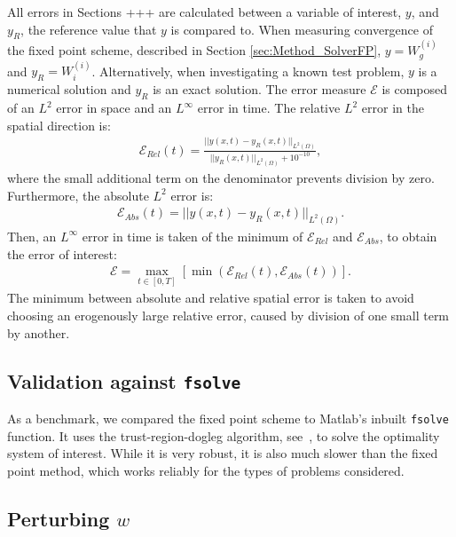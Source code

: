 \documentclass[11pt, a4paper]{article}
\theoremstyle{definition}
\begin{document}
All errors in Sections +++ are calculated between a variable of interest, $y$, and $y_R$, the reference value that $y$ is compared to. When measuring convergence of the fixed point scheme, described in Section \ref{sec:Method_SolverFP}, $y = W^{(i)}_g$ and $y_R = W^{(i)}_i$. Alternatively, when investigating a known test problem, $y$ is a numerical solution and $y_R$ is an exact solution. The error measure $\mathcal{E}$ is composed of an $L^2$ error in space and an $L^\infty$ error in time. The relative $L^2$ error in the spatial direction is:
\begin{align*}
\mathcal{E}_{Rel}(t) = \frac{|| y(x,t) - y_{R}(x,t)||_{L^2(\Omega)} }{||y_R(x,t) ||_{L^2(\Omega)}+ 10^{-10}},
\end{align*}
where the small additional term on the denominator prevents division by zero.
Furthermore, the absolute $L^2$ error is:
\begin{align*}
\mathcal{E}_{Abs}(t) = || y(x,t) - y_R(x,t)||_{L^2(\Omega)}.
\end{align*}
Then, an $L^\infty$ error in time is taken of the minimum of $\mathcal{E}_{Rel}$ and $\mathcal{E}_{Abs}$, to obtain the error of interest:
\begin{align*}
\mathcal{E} = \max_{t \in [0,T]}\left[\min\left(\mathcal{E}_{Rel}(t), \mathcal{E}_{Abs}(t)\right)\right].
\end{align*}
The minimum between absolute and relative spatial error is taken to avoid choosing an erogenously large relative error, caused by division of one small term by another.




\subsection{Validation against \texttt{fsolve}}
As a benchmark, we compared the fixed point scheme to Matlab's inbuilt \texttt{fsolve} function. It uses the trust-region-dogleg algorithm, see~\cite{Powell1}, to solve the optimality system of interest. While it is very robust, it is also much slower than the fixed point method, which works reliably for the types of problems considered. 


\subsection{Perturbing $w$}

\end{document}
